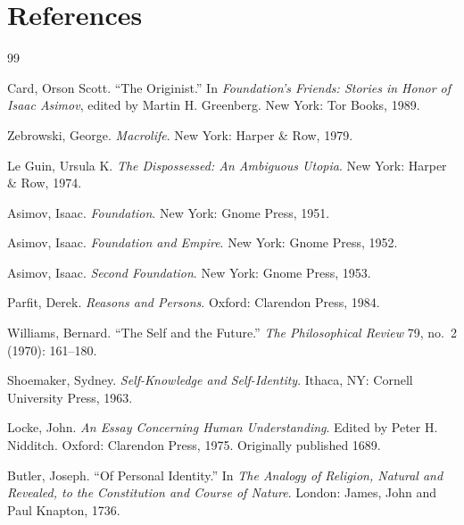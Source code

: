 \documentclass[
  11pt,
  a4paper,
  DIV=12,
  BCOR=0mm,
  parskip=half-
]{scrartcl}
\theoremstyle{definition}
\theoremstyle{plain}
\theoremstyle{remark}
\begin{document}
\newpage

%

\clearpage
\section*{References}

\begin{thebibliography}{99}

Card, Orson Scott.
``The Originist.''
In \emph{Foundation's Friends: Stories in Honor of Isaac Asimov},
edited by Martin H. Greenberg.
New York: Tor Books, 1989.

Zebrowski, George.
\emph{Macrolife}.
New York: Harper \& Row, 1979.

Le Guin, Ursula K.
\emph{The Dispossessed: An Ambiguous Utopia}.
New York: Harper \& Row, 1974.

Asimov, Isaac.
\emph{Foundation}.
New York: Gnome Press, 1951.

Asimov, Isaac.
\emph{Foundation and Empire}.
New York: Gnome Press, 1952.

Asimov, Isaac.
\emph{Second Foundation}.
New York: Gnome Press, 1953.

Parfit, Derek.
\emph{Reasons and Persons}.
Oxford: Clarendon Press, 1984.

Williams, Bernard.
``The Self and the Future.''
\emph{The Philosophical Review}
79, no.~2 (1970): 161--180.

Shoemaker, Sydney.
\emph{Self-Knowledge and Self-Identity}.
Ithaca, NY: Cornell University Press, 1963.

Locke, John.
\emph{An Essay Concerning Human Understanding}.
Edited by Peter H. Nidditch.
Oxford: Clarendon Press, 1975.
Originally published 1689.

Butler, Joseph.
``Of Personal Identity.''
In \emph{The Analogy of Religion, Natural and Revealed, to the Constitution
and Course of Nature}.
London: James, John and Paul Knapton, 1736.


\end{thebibliography}
\end{document}
